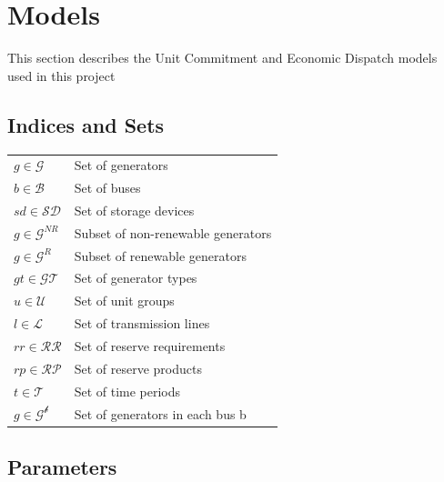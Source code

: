 \documentclass[12pt,LUDisStyle,twosided]{book}
\newcommand{\mc}{\mathcal}
\begin{document}
\section{Models}

This section describes the Unit Commitment and Economic Dispatch models used in this project

\subsection{Indices and Sets}

\begin{tabular}{ll}

$g \in \mc{G} $& Set of generators\\
$b \in \mc{B} $& Set of buses\\
$sd \in \mc{SD} $& Set of storage devices\\
$g \in \mc{G}^{NR} $& Subset of non-renewable generators\\
$g \in \mc{G}^{R} $& Subset of renewable generators \\
$gt \in \mc{GT} $& Set of generator types \\
$u \in \mc{U} $& Set of unit groups \\
$l \in \mc{L} $& Set of transmission lines \\
$rr \in \mc{RR} $& Set of reserve requirements \\
$rp \in \mc{RP} $& Set of reserve products \\
$t \in \mc{T} $& Set of time periods \\
$g \in \mc{G^{b}} $& Set of generators in each bus b \\


\end{tabular}

\newpage
\subsection{Parameters}
\end{document}
